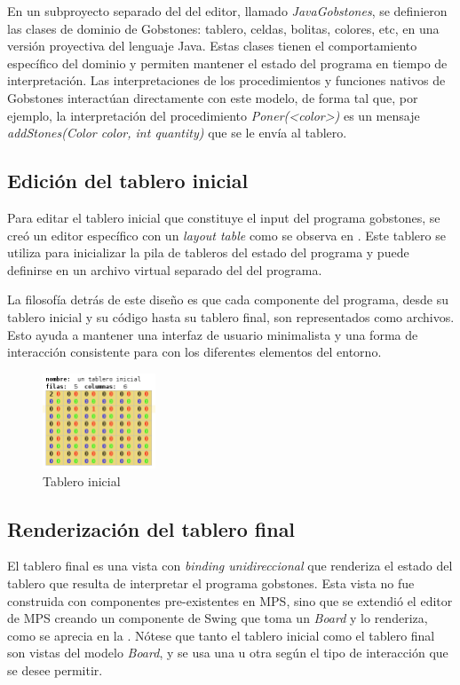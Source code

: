 En un subproyecto separado del del editor, llamado \textit{JavaGobstones}, se definieron las clases de dominio de Gobstones: tablero, celdas, bolitas, colores, etc, en una versión proyectiva del lenguaje Java. Estas clases tienen el comportamiento específico del dominio y permiten mantener el estado del programa en tiempo de interpretación. Las interpretaciones de los procedimientos y funciones nativos de Gobstones interactúan directamente con este modelo, de forma tal que, por ejemplo, la interpretación del procedimiento \textit{Poner(<color>)} es un mensaje \textit{addStones(Color color, int quantity)} que se le envía al tablero.

\subsection{Edición del tablero inicial}

Para editar el tablero inicial que constituye el input del programa gobstones, se creó un editor específico con un \textit{layout table} como se observa en . Este tablero se utiliza para inicializar la pila de tableros del estado del programa y puede definirse en un archivo virtual separado del del programa. 

La filosofía detrás de este diseño es que cada componente del programa, desde su tablero inicial y su código hasta su tablero final, son representados como archivos. Esto ayuda a mantener una interfaz de usuario minimalista y una forma de interacción consistente para con los diferentes elementos del entorno.

\begin{figure}[hb]
\centering
\includegraphics[width=0.3\textwidth]{assets/initial_board}
\caption{Tablero inicial}
\label{fig:initial_board}
\end{figure}


\subsection{Renderización del tablero final}

El tablero final es una vista con \textit{binding unidireccional} que renderiza el estado del tablero que resulta de interpretar el programa gobstones. Esta vista no fue construida con componentes pre-existentes en MPS, sino que se extendió el editor de MPS creando un componente de Swing\cite{swing} que toma un \textit{Board} y lo renderiza, como se aprecia en la . Nótese que tanto el tablero inicial como el tablero final son vistas del modelo \textit{Board}, y se usa una u otra según el tipo de interacción que se desee permitir.

